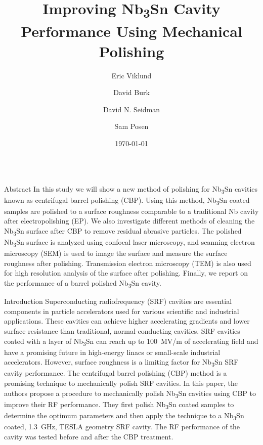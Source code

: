 \documentclass{beamer}
\title{Improving Nb\textsubscript{3}Sn Cavity Performance Using Mechanical Polishing}%
\author[shortname]{\large Eric Viklund \inst{1, 2} \and David Burk \inst{2} \and David N. Seidman \inst{1} \and Sam Posen \inst{2}}
\institute[shortinst]{\large \inst{1} Department of Materials Science and Engineering, Northwestern University \newline \inst{2} Fermi National Accelerator Laboratory}
\date{\today}%
\begin{document}
%
    \begin{frame}{}
        \maketitle
        \begin{columns}[t]
            \begin{column}{0.32\linewidth}
                \begin{block}{\label{sec:abstract}Abstract}
                    In this study we will show a new method of polishing for Nb\textsubscript{3}Sn cavities known as centrifugal barrel polishing (CBP). Using this method, Nb\textsubscript{3}Sn coated samples are polished to a surface roughness comparable to a traditional Nb cavity after electropolishing (EP). We also investigate different methods of cleaning the Nb\textsubscript{3}Sn surface after CBP to remove residual abrasive particles. The polished Nb\textsubscript{3}Sn surface is analyzed using confocal laser microscopy, and scanning electron microscopy (SEM) is used to image the surface and measure the surface roughness after polishing. Transmission electron microscopy (TEM) is also used for high resolution analysis of the surface after polishing. Finally, we report on the performance of a barrel polished Nb\textsubscript{3}Sn cavity.
                \end{block}
                \begin{block}{\label{sec:introduction}Introduction}
                    Superconducting radiofrequency (SRF) cavities are essential components in particle accelerators used for various scientific and industrial applications. These cavities can achieve higher accelerating gradients and lower surface resistance than traditional, normal-conducting cavities. SRF cavities coated with a layer of Nb\textsubscript{3}Sn can reach up to 100~MV/m of accelerating field and have a promising future in high-energy linacs or small-scale industrial accelerators. However, surface roughness is a limiting factor for Nb\textsubscript{3}Sn SRF cavity performance. The centrifugal barrel polishing (CBP) method is a promising technique to mechanically polish SRF cavities. In this paper, the authors propose a procedure to mechanically polish Nb\textsubscript{3}Sn cavities using CBP to improve their RF performance. They first polish Nb\textsubscript{3}Sn coated samples to determine the optimum parameters and then apply the technique to a Nb\textsubscript{3}Sn coated, 1.3~GHz, TESLA geometry SRF cavity. The RF performance of the cavity was tested before and after the CBP treatment.

\end{block}
\end{column}
\end{columns}
\end{frame}
\end{document}
